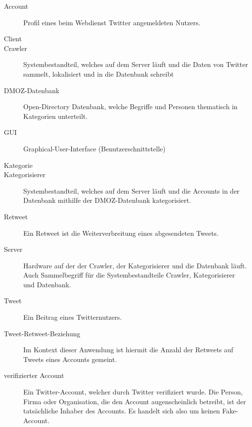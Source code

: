 
\begin{description}
	\item[Account] Profil eines beim Webdienst Twitter angemeldeten Nutzers.
	\item[Client]
	\item[Crawler] Systembestandteil, welches auf dem Server läuft und die Daten von Twitter sammelt, lokalisiert und in die Datenbank schreibt
	\item [DMOZ-Datenbank] Open-Directory Datenbank, welche Begriffe und Personen thematisch in Kategorien unterteilt.
	\item[GUI] Graphical-User-Interface (Benutzerschnittstelle)
	\item[Kategorie]
	\item[Kategorisierer] Systembestandteil, welches auf dem Server läuft und die Accounts in der Datenbank mithilfe der DMOZ-Datenbank kategorisiert.
	\item[Retweet] Ein Retweet ist die Weiterverbreitung eines abgesendeten Tweets.
	\item[Server] Hardware auf der der Crawler, der Kategorisierer und die Datenbank läuft. Auch Sammelbegriff für die Systembestandteile Crawler, Kategorisierer und Datenbank.
	\item[Tweet] Ein Beitrag eines Twitternutzers.
	\item[Tweet-Retweet-Beziehung] Im Kontext dieser Anwendung ist hiermit die Anzahl der Retweets auf Tweets eines Accounts gemeint. 
	\item[verifizierter Account] Ein Twitter-Account, welcher durch Twitter verifiziert wurde. Die Person, Firma oder Organisation, die den Account augenscheinlich betreibt, ist der tatsächliche Inhaber des Accounts. Es handelt sich also um keinen Fake-Account.
\end{description}

